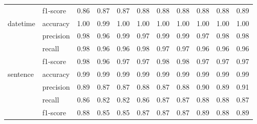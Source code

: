 \begin{tabular}{llrrrrrrrrr}
                 & f1-score &                    0.86 &                    0.87 &                    0.87 &                    0.88 &                    0.88 &                    0.88 &                    0.88 &                    0.88 &                    0.89 \\
datetime & accuracy &                    1.00 &                    0.99 &                    1.00 &                    1.00 &                    1.00 &                    1.00 &                    1.00 &                    1.00 &                    1.00 \\
                 & precision &                    0.98 &                    0.96 &                    0.99 &                    0.97 &                    0.99 &                    0.99 &                    0.97 &                    0.98 &                    0.98 \\
                 & recall &                    0.98 &                    0.96 &                    0.96 &                    0.98 &                    0.97 &                    0.97 &                    0.96 &                    0.96 &                    0.96 \\
                 & f1-score &                    0.98 &                    0.96 &                    0.97 &                    0.97 &                    0.98 &                    0.98 &                    0.97 &                    0.97 &                    0.97 \\
sentence & accuracy &                    0.99 &                    0.99 &                    0.99 &                    0.99 &                    0.99 &                    0.99 &                    0.99 &                    0.99 &                    0.99 \\
                 & precision &                    0.89 &                    0.87 &                    0.87 &                    0.88 &                    0.87 &                    0.88 &                    0.90 &                    0.89 &                    0.91 \\
                 & recall &                    0.86 &                    0.82 &                    0.82 &                    0.86 &                    0.87 &                    0.87 &                    0.88 &                    0.88 &                    0.87 \\
                 & f1-score &                    0.88 &                    0.85 &                    0.85 &                    0.87 &                    0.87 &                    0.87 &                    0.89 &                    0.88 &                    0.89 \\

\end{tabular}

